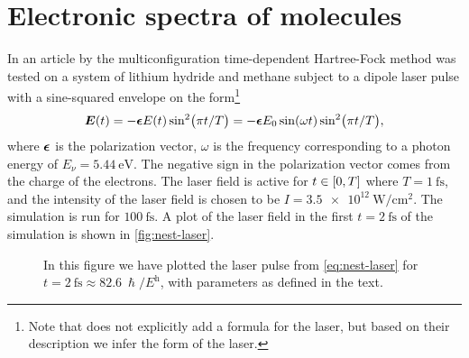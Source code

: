     \section{Electronic spectra of molecules}
        In an article by \citeauthor{nest} \cite{nest} the
        multiconfiguration time-dependent Hartree-Fock method was tested on
        a system of lithium hydride and methane subject to a dipole
        laser pulse with a sine-squared envelope on the form\footnote{%
            Note that \citeauthor{nest} \cite{nest} does not explicitly add
            a formula for the laser, but based on their description we infer
            the form of the laser.
        }
        \begin{align}
            \boldsymbol{E}(t)
            = -\boldsymbol{\epsilon} E(t)
            \sin[2](\pi t / T)
            = -\boldsymbol{\epsilon} E_0 \sin(\omega t)
            \sin[2](\pi t / T),
            \label{eq:nest-laser}
        \end{align}
        where $\boldsymbol{\epsilon}$ is the polarization vector, $\omega$ is the
        frequency corresponding to a photon energy of $E_{\nu} =
        \SI{5.44}{\electronvolt}$.
        The negative sign in the polarization vector comes from the charge of
        the electrons.
        The laser field is active for $t \in \left[ 0, T \right]$ where $T =
        \SI{1}{\femto\second}$, and the intensity of the laser field is chosen
        to be $I = \SI{3.5e12}{\watt/\cm^2}$.
        The simulation is run for $\SI{100}{\femto\second}$.
        A plot of the laser field in the first $t = \SI{2}{\femto\second}$ of
        the simulation is shown in \autoref{fig:nest-laser}.
        \begin{figure}
            \centering
            \caption{In this figure we have plotted the laser pulse from
            \autoref{eq:nest-laser} for $t = \SI{2}{\femto\second} \approx
            \SI{82.6}{\hslash / \hartree}$, with parameters as defined in the
            text.}
            \label{fig:nest-laser}
        \end{figure}
